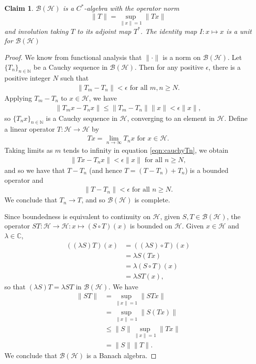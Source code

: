 \documentclass[12pt,a4paper]{report}
\theoremstyle{plain}
\newtheorem*{claim}{Claim}
\theoremstyle{definition}
\newcommand{\1}{\mathbbm{1}}
\newcommand{\C}{\mathbb{C}}
\newcommand{\N}{\mathbb{N}}
\renewcommand{\H}{\mathcal{H}}
\newcommand{\B}{\mathcal{B}}
\newcommand{\BH}{\mathcal{\B(\H)}}
\begin{document}
\begin{claim} $\B(\H)$ is a $C^\ast$-algebra with the operator norm 
\[
	\|T\|= \sup_{\|x\|=1}{\|Tx\|}
\]
and involution taking $T$ to its adjoint map $T^\ast$. 
The identity map $I:x\mapsto x$ is a unit for $\BH$
\end{claim}
\begin{proof}
	We know from functional analysis that $\|\cdot\|$ is a norm on $\BH$. Let $\{T_n\}_{n\in\N}$ be a 
	Cauchy sequence in $\BH$. Then for any positive $\epsilon$, there is a positive integer $N$ such 
	that 
	\begin{align*}
		\|T_m-T_n\| < \epsilon \mbox{ for all } m,n \geq N.
	\end{align*}
	Applying $T_m-T_n$ to $x \in \H$, we have 
	\begin{align}\label{eqn:cauchyTn}
		\|T_mx-T_nx\| \leq \|T_m-T_n\| \|x\| < \epsilon \|x\|,
	\end{align}
	so $\{T_nx\}_{n\in\N}$ is a Cauchy sequence in $\H$, converging to an element in $\H$.
	Define a linear operator $T:\H \to \H$ by 
	\begin{align*}
		Tx= \lim_{n\to\infty}{T_nx} \mbox{ for } x \in \H.
	\end{align*}
	Taking limits as $m$ tends to infinity in equation \eqref{eqn:cauchyTn}, we obtain
	\begin{align*}
		\|Tx-T_nx\| < \epsilon \|x\| \mbox{ for all }n \geq N,
	\end{align*}
	and so we have that $T-T_n$ (and hence $T=(T-T_n)+T_n$) is a bounded operator and  
	\begin{align*}
		\|T-T_n\| <\epsilon \mbox{ for all }n \geq N.
	\end{align*}
	We conclude that $T_n \to T$, and so $\BH$ is complete.
	
	Since boundedness is equivalent to continuity on $\H$, given $S,T\in\BH$, the operator 
	$ST:\H \to \H: x \mapsto (S\circ T)(x)$ is bounded on $\H$.
	Given $x\in\H$ and $\lambda\in\C$, 
	\begin{align*}
			((\lambda S)T)(x)
		&=	((\lambda S)\circ T)(x)												\\
		&=	\lambda S(Tx)														\\
		&=	\lambda (S\circ T)(x)												\\
		&=	\lambda ST(x),
	\end{align*} 
	so that $(\lambda S)T = \lambda ST$ in $\BH$. We have 
	\begin{align*}
				\|ST\|
		&=		\sup_{\|x\|=1}{\|STx\|} 										\\
		&=		\sup_{\|x\|=1}{\|S(Tx)\|} 										\\
		&\leq	\|S\| \sup_{\|x\|=1}{\|Tx\|} 									\\
		&=		\|S\| \|T\|.
	\end{align*}
	We conclude that $\BH$ is a Banach algebra.
	

\end{proof}
\end{document}
